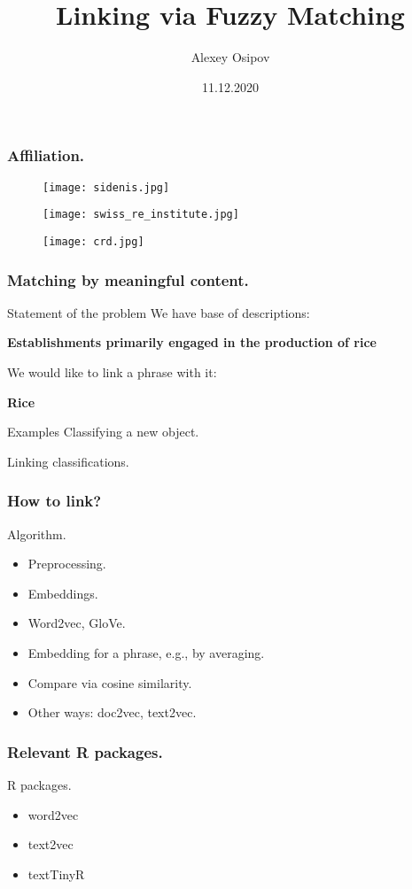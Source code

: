 \documentclass{beamer}
\title{Linking via Fuzzy Matching}
\author{Alexey Osipov}
\date{11.12.2020}
\begin{document}
\maketitle
\begin{frame}[fragile]
\frametitle{Affiliation.}
\begin{figure}[h!]
\centering
\texttt{[image: sidenis.jpg]}
\end{figure}
\begin{figure}[h!]
\centering
\texttt{[image: swiss\_re\_institute.jpg]}
\end{figure}
\begin{figure}[h!]
\centering
\texttt{[image: crd.jpg]}
\end{figure}
\end{frame}
\begin{frame}[fragile]
\frametitle{Matching by meaningful content.}
\begin{block}{Statement of the problem}
We have base of descriptions:

\textbf{Establishments primarily engaged in the production of rice}

We would like to link a phrase with it:

\textbf{Rice}
\end{block}

\begin{block}{Examples}
Classifying a new object.

Linking classifications.
\end{block}
\end{frame}
\begin{frame}[fragile]
\frametitle{How to link?}
\begin{block}{Algorithm.}
\begin{itemize}
  \item Preprocessing.
	\item Embeddings.
	\item Word2vec, GloVe.
	\item Embedding for a phrase, e.g., by averaging.
	\item Compare via cosine similarity.
	\item Other ways: doc2vec, text2vec.
\end{itemize}
\end{block}
\end{frame}
\begin{frame}[fragile]
\frametitle{Relevant R packages.}
\begin{block}{R packages.}
\begin{itemize}
\item word2vec
\item text2vec
\item textTinyR
\end{itemize}
\end{block}
\end{frame}
\end{document}
